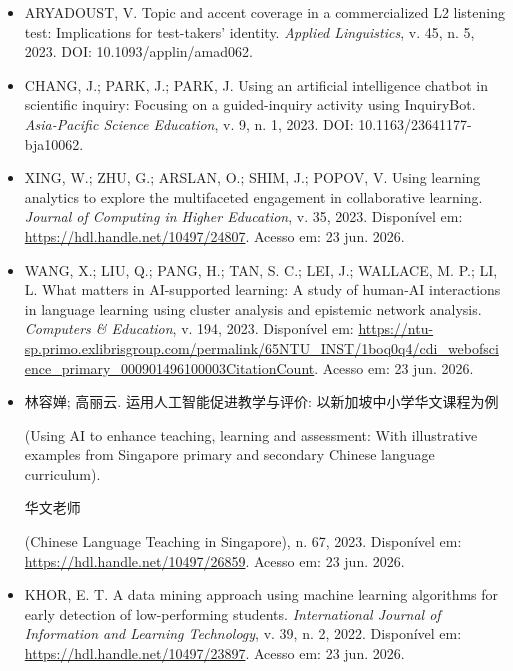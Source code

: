 \documentclass[english]{textolivre}
\begin{document}
\begin{itemize}
\item[] ARYADOUST, V. Topic and accent coverage in a commercialized L2 listening test: Implications for test-takers’ identity. \textit{Applied Linguistics}, v. 45, n. 5, 2023. DOI: 10.1093/applin/amad062.

\item[] CHANG, J.; PARK, J.; PARK, J. Using an artificial intelligence chatbot in scientific inquiry: Focusing on a guided-inquiry activity using InquiryBot. \textit{Asia-Pacific Science Education}, v. 9, n. 1, 2023. DOI: 10.1163/23641177-bja10062.

\item[] XING, W.; ZHU, G.; ARSLAN, O.; SHIM, J.; POPOV, V. Using learning analytics to explore the multifaceted engagement in collaborative learning. \textit{Journal of Computing in Higher Education}, v. 35, 2023. Disponível em: \url{https://hdl.handle.net/10497/24807}. Acesso em: 23 jun. 2026.

\item[] WANG, X.; LIU, Q.; PANG, H.; TAN, S. C.; LEI, J.; WALLACE, M. P.; LI, L. What matters in AI-supported learning: A study of human-AI interactions in language learning using cluster analysis and epistemic network analysis. \textit{Computers \& Education}, v. 194, 2023. Disponível em: \url{https://ntu-sp.primo.exlibrisgroup.com/permalink/65NTU_INST/1boq0q4/cdi_webofscience_primary_000901496100003CitationCount}. Acesso em: 23 jun. 2026.

\item[] \begin{otherlanguage}{chinese}林容婵; 高丽云. 运用人工智能促进教学与评价: 以新加坡中小学华文课程为例\end{otherlanguage} (Using AI to enhance teaching, learning and assessment: With illustrative examples from Singapore primary and secondary Chinese language curriculum). \begin{otherlanguage}{chinese}华文老师\end{otherlanguage} (Chinese Language Teaching in Singapore), n. 67, 2023. Disponível em: \url{https://hdl.handle.net/10497/26859}. Acesso em: 23 jun. 2026.

\item[] KHOR, E. T. A data mining approach using machine learning algorithms for early detection of low-performing students. \textit{International Journal of Information and Learning Technology}, v. 39, n. 2, 2022. Disponível em: \url{https://hdl.handle.net/10497/23897}. Acesso em: 23 jun. 2026.


\end{itemize}
\end{document}

